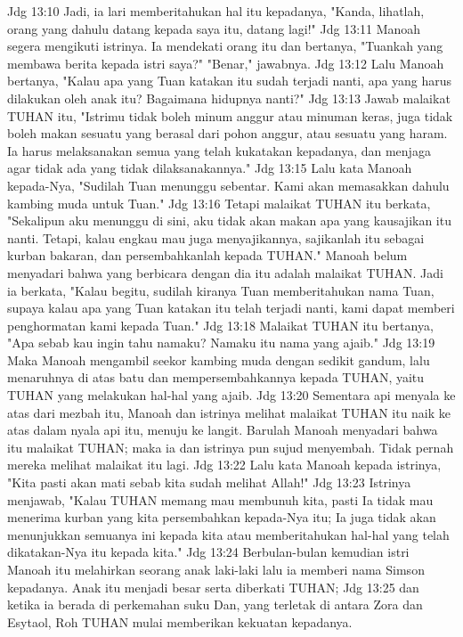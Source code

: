 Jdg 13:10  Jadi, ia lari memberitahukan hal itu kepadanya, "Kanda, lihatlah, orang yang dahulu datang kepada saya itu, datang lagi!"
Jdg 13:11  Manoah segera mengikuti istrinya. Ia mendekati orang itu dan bertanya, "Tuankah yang membawa berita kepada istri saya?" "Benar," jawabnya.
Jdg 13:12  Lalu Manoah bertanya, "Kalau apa yang Tuan katakan itu sudah terjadi nanti, apa yang harus dilakukan oleh anak itu? Bagaimana hidupnya nanti?"
Jdg 13:13  Jawab malaikat TUHAN itu, "Istrimu tidak boleh minum anggur atau minuman keras, juga tidak boleh makan sesuatu yang berasal dari pohon anggur, atau sesuatu yang haram. Ia harus melaksanakan semua yang telah kukatakan kepadanya, dan menjaga agar tidak ada yang tidak dilaksanakannya."
Jdg 13:15  Lalu kata Manoah kepada-Nya, "Sudilah Tuan menunggu sebentar. Kami akan memasakkan dahulu kambing muda untuk Tuan."
Jdg 13:16  Tetapi malaikat TUHAN itu berkata, "Sekalipun aku menunggu di sini, aku tidak akan makan apa yang kausajikan itu nanti. Tetapi, kalau engkau mau juga menyajikannya, sajikanlah itu sebagai kurban bakaran, dan persembahkanlah kepada TUHAN." Manoah belum menyadari bahwa yang berbicara dengan dia itu adalah malaikat TUHAN. Jadi ia berkata, "Kalau begitu, sudilah kiranya Tuan memberitahukan nama Tuan, supaya kalau apa yang Tuan katakan itu telah terjadi nanti, kami dapat memberi penghormatan kami kepada Tuan."
Jdg 13:18  Malaikat TUHAN itu bertanya, "Apa sebab kau ingin tahu namaku? Namaku itu nama yang ajaib."
Jdg 13:19  Maka Manoah mengambil seekor kambing muda dengan sedikit gandum, lalu menaruhnya di atas batu dan mempersembahkannya kepada TUHAN, yaitu TUHAN yang melakukan hal-hal yang ajaib.
Jdg 13:20  Sementara api menyala ke atas dari mezbah itu, Manoah dan istrinya melihat malaikat TUHAN itu naik ke atas dalam nyala api itu, menuju ke langit. Barulah Manoah menyadari bahwa itu malaikat TUHAN; maka ia dan istrinya pun sujud menyembah. Tidak pernah mereka melihat malaikat itu lagi.
Jdg 13:22  Lalu kata Manoah kepada istrinya, "Kita pasti akan mati sebab kita sudah melihat Allah!"
Jdg 13:23  Istrinya menjawab, "Kalau TUHAN memang mau membunuh kita, pasti Ia tidak mau menerima kurban yang kita persembahkan kepada-Nya itu; Ia juga tidak akan menunjukkan semuanya ini kepada kita atau memberitahukan hal-hal yang telah dikatakan-Nya itu kepada kita."
Jdg 13:24  Berbulan-bulan kemudian istri Manoah itu melahirkan seorang anak laki-laki lalu ia memberi nama Simson kepadanya. Anak itu menjadi besar serta diberkati TUHAN;
Jdg 13:25  dan ketika ia berada di perkemahan suku Dan, yang terletak di antara Zora dan Esytaol, Roh TUHAN mulai memberikan kekuatan kepadanya.
